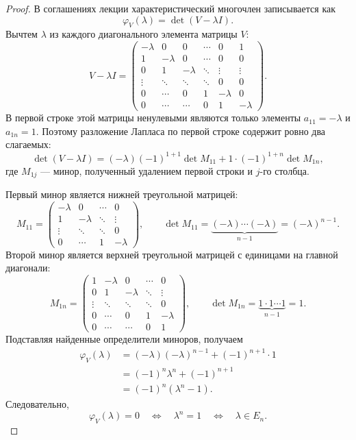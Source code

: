\documentclass[12pt,a4paper]{article}
\theoremstyle{definition}
\theoremstyle{remark}
\begin{document}
\begin{proof}
В соглашениях лекции характеристический многочлен записывается как
\[
  \varphi_V(\lambda)=\det(V-\lambda I).
\]
Вычтем $\lambda$ из каждого диагонального элемента матрицы $V$:
\[
  V-\lambda I=
  \begin{pmatrix}
    -\lambda & 0        & 0        & \cdots & 0        & 1\\
    1        & -\lambda & 0        & \cdots & 0        & 0\\
    0        & 1        & -\lambda & \ddots & \vdots   & \vdots\\
    \vdots   & \ddots   & \ddots   & \ddots & 0        & 0\\
    0        & \cdots   & 0        & 1      & -\lambda & 0\\
    0        & \cdots   & \cdots   & 0      & 1        & -\lambda
  \end{pmatrix}.
\]
В первой строке этой матрицы ненулевыми являются только элементы
$a_{11}=-\lambda$ и $a_{1n}=1$. Поэтому разложение Лапласа по первой строке
содержит ровно два слагаемых:
\[
  \det(V-\lambda I)
  =(-\lambda)(-1)^{1+1}\det M_{11}
   +1\cdot(-1)^{1+n}\det M_{1n},
\]
где $M_{1j}$ --- минор, полученный удалением первой строки и $j$-го
столбца.

Первый минор является нижней треугольной матрицей:
\[
  M_{11}=
  \begin{pmatrix}
    -\lambda & 0        & \cdots & 0\\
    1        & -\lambda & \ddots & \vdots\\
    \vdots   & \ddots   & \ddots & 0\\
    0        & \cdots   & 1      & -\lambda
  \end{pmatrix},
  \qquad
  \det M_{11}=\underbrace{(-\lambda)\cdots(-\lambda)}_{n-1}
  =(-\lambda)^{n-1}.
\]
Второй минор является верхней треугольной матрицей с единицами на главной
диагонали:
\[
  M_{1n}=
  \begin{pmatrix}
    1      & -\lambda & 0        & \cdots & 0\\
    0      & 1        & -\lambda & \ddots & \vdots\\
    \vdots & \ddots   & \ddots   & \ddots & 0\\
    0      & \cdots   & 0        & 1      & -\lambda\\
    0      & \cdots   & \cdots   & 0      & 1
  \end{pmatrix},
  \qquad
  \det M_{1n}=\underbrace{1\cdot1\cdots1}_{n-1}=1.
\]
Подставляя найденные определители миноров, получаем
\begin{align*}
  \varphi_V(\lambda)
  &=(-\lambda)(-\lambda)^{n-1}
    +(-1)^{n+1}\cdot1\\
  &=(-1)^n\lambda^n+(-1)^{n+1}\\
  &=(-1)^n(\lambda^n-1).
\end{align*}
Следовательно,
\[
  \varphi_V(\lambda)=0
  \quad\Longleftrightarrow\quad
  \lambda^n=1
  \quad\Longleftrightarrow\quad
  \lambda\in E_n.
\]
\end{proof}
\end{document}
